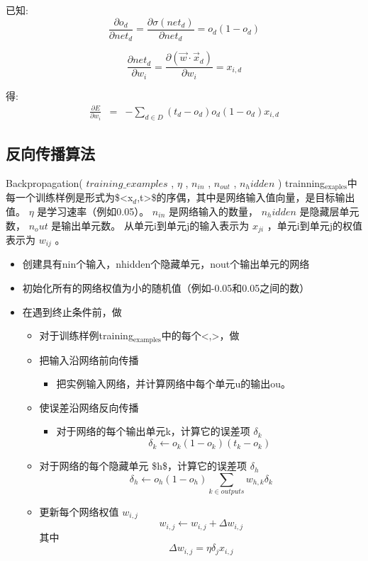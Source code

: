 \documentclass{article}
\begin{document}
已知:
\[\frac{\partial o_{d}}{\partial net_{d}} = \frac{\partial
\sigma(net_{d})}{\partial net_{d}} =  o_{d}(1 -  o_{d})  \]

\[\frac{\partial net_{d}}{\partial w_{i}} = \frac{\partial (\vec{w} \cdot
\vec{x}_{d})}{\partial w_{i}} = x_{i,d} \]

得:
\begin{eqnarray}
\frac{\partial E}{\partial w_{i}} & = & - \sum_{d \in D} (t_{d} - o_{d})
o_{d}(1-o_{d}) x_{i,d} \nonumber
\end{eqnarray}
\subsection{反向传播算法}
\label{sec-6-3}


Backpropagation( $training\_examples$ , $\eta$ , $n_{in}$ , $n_{out}$ , $n_hidden$ )
trainning$_{\mathrm{exaples}}$中每一个训练样例是形式为\$<x$_d$,t>\$的序偶，其中是网络输入值向量，是目标输出值。
 $\eta$ 是学习速率（例如0.05）。 $n_{in}$ 是网络输入的数量， $n_hidden$ 是隐藏层单元数， $n_out$ 是输出单元数。
从单元i到单元j的输入表示为 $x_{ji}$ ，单元i到单元j的权值表示为 $w_{ij}$ 。
\begin{itemize}
\item 创建具有nin个输入，nhidden个隐藏单元，nout个输出单元的网络
\item 初始化所有的网络权值为小的随机值（例如-0.05和0.05之间的数）
\item 在遇到终止条件前，做
\begin{itemize}
\item 对于训练样例training$_{\mathrm{examples}}$中的每个<,>，做
\item 把输入沿网络前向传播
\begin{itemize}
\item 把实例输入网络，并计算网络中每个单元u的输出ou。
\end{itemize}
\item 使误差沿网络反向传播
\begin{itemize}
\item 对于网络的每个输出单元k，计算它的误差项 $\delta_{k}$
                        \[\delta_{k} \leftarrow o_{k}(1-o_{k})(t_{k}-o_{k})\]
\end{itemize}
\item 对于网络的每个隐藏单元 \$h\$，计算它的误差项 $\delta_h$
                      \[\delta_{h} \leftarrow o_{h}(1-o_{h})\sum_{k \in outputs}w_{h,k}\delta_{k}\]
\item 更新每个网络权值 $w_{i,j}$
                      \[w_{i,j} \leftarrow w_{i,j} + \Delta w_{i,j}\]
            其中
                      \[\Delta w_{i,j} = \eta \delta_{j} x_{i,j}\]
\end{itemize}
\end{itemize}
\end{document}
